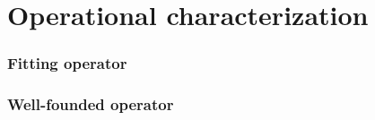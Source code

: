 \part{Operational characterization}

\section{Fitting operator}

\section{Well-founded operator}

%
